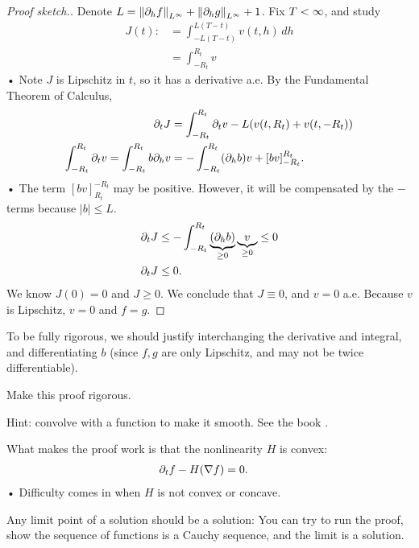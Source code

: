 \begin{proof}[Proof sketch.]
Denote $L=\left\Vert {\partial_h f}\right\Vert_{L^\infty}+\left\Vert {\partial_h g}\right\Vert_{L^\infty} + 1$. 
Fix $T<\infty$, and study
\begin{align*}
J(t) :&= \int_{-L(T-t)}^{L(T-t)} v(t,h)\,dh\\
&= \int_{-R_t}^{R_t} v
\end{align*}•
Note $J$ is Lipschitz in $t$, so it has a derivative a.e. By the Fundamental Theorem of Calculus,
\begin{align*}
\partial_t J &=\int_{-R_t}^{R_t} \partial_t v - L(v(t,R_t)+v(t,-R_t))\\
\int_{-R_t}^{R_t} \partial_t v=\int_{-R_t}^{R_t} b \partial_h v
&=-\int_{-R_t}^{R_t} (\partial_h b)v + [bv]_{-R_t}^{R_t}.
\end{align*}•
The term $[bv]^{-R_t}_{R_t}$ may be positive. %
However, it will be compensated by the $-$ terms because $|b|\le L$.
\begin{align*}
\partial_t J &\le -\int_{-R_t}^{R_t} \underbrace{(\partial_h b)}_{\ge 0}\underbrace{v}_{\ge 0}\le 0\\
\partial_t J&\le 0.
\end{align*}
We know $J(0)=0$ and $J\ge 0$. We conclude that $J\equiv 0$, and $v=0$ a.e. Because $v$ is Lipschitz, $v=0$ and $f=g$.
\end{proof}
To be fully rigorous, we should justify interchanging the derivative and integral, and differentiating $b$ (since $f,g$ are only Lipschitz, and may not be twice differentiable).
\begin{exr}
Make this proof rigorous.

Hint: convolve with a function to make it smooth. See the book \cite{evans2010partial}.
\end{exr}
What makes the proof work is that the nonlinearity $H$ is convex:
\begin{align*}
\partial_t f - H(\nabla f)&=0.
\end{align*}•
Difficulty comes in when $H$ is not convex or concave.

Any limit point of a solution should be a solution: You can try to run the proof, show the sequence of functions is a Cauchy sequence, and the limit is a solution.

